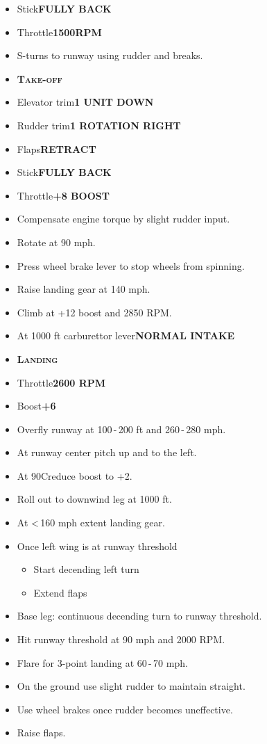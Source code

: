 \documentclass[a4paper,12pt,dvipsnames]{letter}
\newcommand{\button}[1]{\textbf{#1}}
\newcommand{\degC}{\textdegree{}C}
\newcommand{\myHead}[1]{{\LARGE\textsc{\textbf{#1}}}}
\begin{document}
{\begin{itemize}
\begin{itemize}
  \item Throttle\dotfill\button{1000\;RPM}
  \item Breaks\dotfill\button{RELEASE}
 \end{itemize}
 \item Stick\dotfill\button{FULLY BACK}
 \item Throttle\dotfill\button{1500\;RPM}
 \item S-turns to runway using rudder and breaks.
\end{itemize}
\begin{itemize}
 \item[] \myHead{Take-off}
 \item Elevator trim\dotfill\button{1 UNIT DOWN}
 \item Rudder trim\dotfill\button{1 ROTATION RIGHT}
 \item Flaps\dotfill\button{RETRACT}
 \item Stick\dotfill\button{FULLY BACK}
 \item Throttle\dotfill\button{+8 BOOST}
 \item Compensate engine torque by slight rudder input.
 \item Rotate at 90 mph.
 \item Press wheel brake lever to stop wheels from spinning.
 \item Raise landing gear at 140 mph.
 \item Climb at +12 boost and 2850 RPM.
 \item At 1000 ft carburettor lever\dotfill\button{NORMAL INTAKE}
\end{itemize}
\newpage
\begin{itemize}
 \item[] \myHead{Landing}
 \item Throttle\dotfill\button{2600 RPM}
 \item Boost\dotfill\button{+6}
 \item Overfly runway at 100\,-\,200 ft and 260\,-\,280 mph.
 \item At runway center pitch up and to the left.
 \item At 90\degC reduce boost to +2.
 \item Roll out to downwind leg at 1000 ft.
 \item At <\,160 mph extent landing gear.
 \item Once left wing is at runway threshold
 \begin{itemize}
   \item Start decending left turn
   \item Extend flaps
 \end{itemize} 
 \item Base leg: continuous decending turn to runway threshold.
 \item Hit runway threshold at 90 mph and 2000 RPM.
 \item Flare for 3-point landing at 60\,-\,70 mph.
 \item On the ground use slight rudder to maintain straight.
 \item Use wheel brakes once rudder becomes uneffective.
 \item Raise flaps.
\end{itemize}
}
\end{document}
